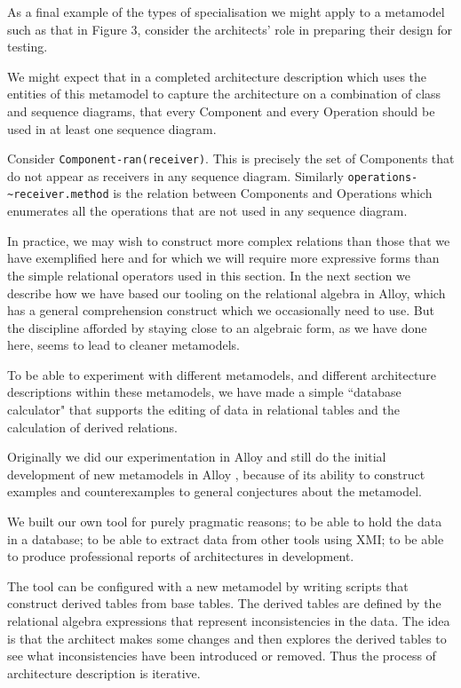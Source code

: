 \documentclass[times, 10pt,twocolumn]{article}
\begin{document}
As a final example of the types of specialisation we might apply to a metamodel such as that in Figure 3, consider the architects' role in preparing their design for testing. 

We might expect that in a completed architecture description which uses the entities of this metamodel to capture the architecture on a combination of class and sequence diagrams, that every Component and every Operation should be used in at least one sequence diagram.

Consider {\small\verb$Component-ran(receiver)$}. This is precisely the set of Components that do not appear as receivers in any sequence diagram.  Similarly {\small\verb$operations-~receiver.method$} is the relation between Components and Operations which enumerates all the operations that are not used in any sequence diagram.

In practice, we may wish to construct more complex relations than those that we have exemplified here and for which we will require more expressive forms than the simple relational operators used in this section. In the next section we describe how we have based our tooling on the relational algebra in Alloy, which has a general comprehension construct which we occasionally need to use. But the discipline afforded by staying close to an algebraic form, as we have done here, seems to lead to cleaner metamodels.



\noindent To be able to experiment with different metamodels, and different architecture descriptions within these metamodels, we have made a simple ``database calculator" that supports the editing of data in relational tables and the calculation of derived relations.

Originally we did our experimentation in Alloy and still do the initial development of new metamodels in Alloy \cite{Alloy}, because of its ability to construct examples and counterexamples to general conjectures about the metamodel.

We built our own tool for purely pragmatic reasons; to be able to hold the data in a database; to be able to extract data from other tools using XMI; to be able to produce professional reports of architectures in development. 

The tool can be configured with a new metamodel by writing scripts that construct derived tables from base tables. The derived tables are defined by the relational algebra expressions that represent inconsistencies in the data. The idea is that the architect makes some changes and then explores the derived tables to see what inconsistencies have been introduced or removed. Thus the process of architecture description is iterative.
\end{document}
